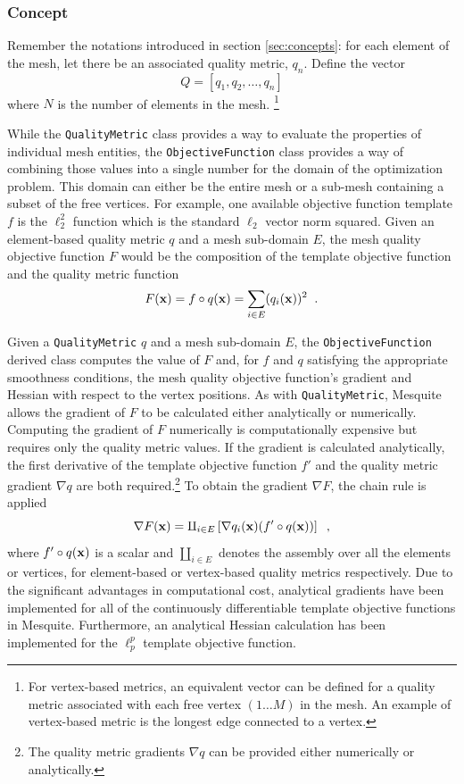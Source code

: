 \subsubsection{Concept}
Remember the notations introduced in section \ref{sec:concepts}:
for each element of the mesh, let there be an associated quality metric, 
$q_n$.  Define the vector 
\begin{equation}
Q = [ q_1, q_2, \ldots, q_n ]
\end{equation}
where $N$ is the number of elements in the mesh. \footnote{For vertex-based metrics, an equivalent vector can be defined for a
quality metric associated with each free vertex $(1 \dots M)$ in the mesh. An example of vertex-based
metric is the longest edge connected to a vertex.}

While the \texttt{QualityMetric} class provides a way to evaluate the
properties of individual mesh entities, the \texttt{ObjectiveFunction}
class provides a way of combining those values into a single number
for the domain of the optimization problem.  This domain can either be
the entire mesh or a sub-mesh containing a subset of the free vertices.
For example, one available objective function template $f$ is the $\ell_{2}^2$
function which is the standard $\ell_{2}$ vector norm squared.  
Given an element-based quality metric $q$ and a mesh sub-domain $E$, the mesh 
quality objective function $F$ would be the composition of the template
objective function and the quality metric function 
\begin{equation}
F({\bf x}) = f \circ q({\bf x}) = \sum_{i \in E} (q_i({\bf x}))^2 \;\; .
\end{equation}

Given a \texttt{QualityMetric} $q$ and a mesh sub-domain $E$, the
\texttt{ObjectiveFunction} derived class computes the value of 
$F$ and, for $f$ and $q$ satisfying the appropriate smoothness
conditions, the mesh quality objective function's gradient and Hessian
with respect to the vertex positions.  As with {\tt QualityMetric},
Mesquite allows the gradient of $F$ to be calculated either
analytically or numerically. Computing the gradient of $F$
numerically is computationally expensive but requires only the quality
metric values.  If the gradient is calculated analytically, the
first derivative of the template objective function $f'$ and the
quality metric gradient $\nabla q$ are both required.\footnote{The 
quality metric gradients $\nabla q$ can be provided either numerically 
or analytically.}
To obtain the gradient $\nabla F$, the chain rule is applied
\begin{equation}
\nabla F({\bf x}) = \amalg_{i \in E} \left[ \nabla q_i({\bf x}) 
 (f' \circ q({\bf x}) ) \right] \;\; ,
\end{equation}
where $ f' \circ q({\bf x})$ is a scalar and $\amalg_{i \in E}$ denotes the
assembly over all the elements or vertices, for element-based or 
vertex-based quality metrics respectively.
Due to the significant advantages in computational
cost, analytical gradients have been implemented for all of the
continuously differentiable template objective functions in Mesquite.
Furthermore, an analytical Hessian calculation has been implemented
for the $\ell_p^p$ template objective function.  

